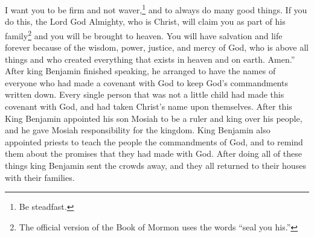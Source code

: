 \bverse \iffalse Therefore, I would that ye should be steadfast and immovable, always abounding in good works, that Christ, the Lord God Omnipotent, may seal you his, that you may be brought to heaven, that ye may have everlasting salvation and eternal life, through the wisdom, and power, and justice, and mercy of him who created all things, in heaven and in earth, who is God above all. Amen. \fi
I want you to be firm and not waver,\footnote{Be steadfast.} and to always do many good things. If you do this, the Lord God Almighty, who is Christ, will claim you as part of his family\footnote{The official version of the Book of Mormon uses the words ``seal you his.''} and you will be brought to heaven. You will have salvation and life forever because of the wisdom, power, justice, and mercy of God, who is above all things and who created everything that exists in heaven and on earth. Amen.''
\bchapter
\bverse \iffalse And now, king Benjamin thought it was expedient, after having finished speaking to the people, that he should take the names of all those who had entered into a covenant with God to keep his commandments. \fi
After king Benjamin finished speaking, he arranged to have the names of everyone who had made a covenant with God to keep God's commandments written down.
\bverse \iffalse And it came to pass that there was not one soul, except it were little children, but who had entered into the covenant and had taken upon them the name of Christ. \fi
Every single person that was not a little child had made this covenant with God, and had taken Christ's name upon themselves.
\bverse \iffalse And again, it came to pass that when king Benjamin had made an end of all these things, and had consecrated his son Mosiah to be a ruler and a king over his people, and had given him all the charges concerning the kingdom, and also had appointed priests to teach the people, that thereby they might hear and know the commandments of God, and to stir them up in remembrance of the oath which they had made, he dismissed the multitude, and they returned, every one, according to their families, to their own houses. \fi
After this King Benjamin appointed his son Mosiah to be a ruler and king over his people, and he gave Mosiah responsibility for the kingdom. King Benjamin also appointed priests to teach the people the commandments of God, and to remind them about the promises that they had made with God. After doing all of these things king Benjamin sent the crowds away, and they all returned to their houses with their families.
